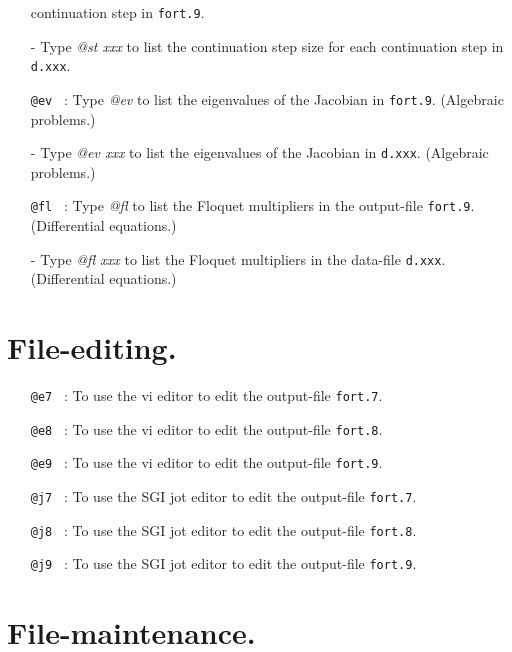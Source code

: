 \documentclass[12pt]{report}
\begin{document}
\begin{itemize}
  continuation step in  {\tt fort.9}. 
  \item[-]
   Type {\it @st xxx} to list the continuation step size for each
  continuation step in {\tt d.xxx}. 
\item[\tt @ev]~:
  Type {\it @ev} to list the eigenvalues of the Jacobian 
  in {\tt fort.9}. 
  (Algebraic problems.)
  \item[-]
   Type {\it @ev xxx} to list the eigenvalues of the Jacobian 
  in {\tt d.xxx}. 
  (Algebraic problems.)
\item[\tt @fl]~:
  Type {\it @fl} to list the Floquet multipliers
  in the output-file {\tt fort.9}. 
  (Differential equations.)
  \item[-]
   Type {\it @fl xxx} to list the Floquet multipliers 
  in the data-file {\tt d.xxx}. 
  (Differential equations.)
\end{itemize}

\section{ File-editing.} 

\begin{itemize}

\item[\tt @e7]~:
  To use the vi editor to edit the output-file {\tt fort.7}.
\item[\tt @e8]~:
  To use the vi editor to edit the output-file {\tt fort.8}.
\item[\tt @e9]~:
  To use the vi editor to edit the output-file {\tt fort.9}.
\item[\tt @j7]~:
  To use the SGI jot editor to edit the output-file {\tt fort.7}.
\item[\tt @j8]~:
  To use the SGI jot editor to edit the output-file {\tt fort.8}.
\item[\tt @j9]~:
  To use the SGI jot editor to edit the output-file {\tt fort.9}.
  
\end{itemize}

\section{ File-maintenance.} 
\end{document}
